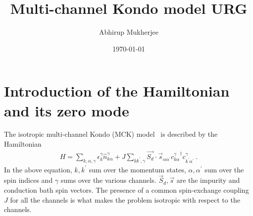 \documentclass[12pt]{revtex4-2}
\begin{document}
\title{Multi-channel Kondo model URG}
\author{Abhirup Mukherjee}
\date{\today}
\maketitle
\tableofcontents
\section{Introduction of the Hamiltonian and its zero mode}
The isotropic multi-channel Kondo (MCK) model~\cite{Noz_blandin_1980,Gan_Andrei_Coleman_1993,emery_kivelson,Gan_mchannel_1994,Tsvelick_Weigmann_mchannel_1984,Tsvelick_weigmann_mchannel_1985,parcollet_olivier_large_N,kimura_taro_Su_N_kondo,PhysRevB.73.224445,cox_jarrell_two_channel_rev,affleck_1991_overscreen,Coleman_tsvelik,affleck1993exact,coleman_pepin_2003,roch_nicolas_costi_2009,schiller_avraham_2008,Durganandini_2011} is described by the Hamiltonian
\begin{align}
	\label{mc_ham}
	H = \sum_{k,\alpha,\gamma}\epsilon_{k}^\gamma \hat n^\gamma_{k\alpha} + J\sum_{kk^\prime,\gamma} \vec{S_d}\cdot\vec{s}_{\alpha\alpha^\prime}{c^\gamma_{k\alpha}}^\dagger c^\gamma_{k^\prime\alpha^\prime}~.
\end{align}
In the above equation, \(k,k^\prime\) sum over the momentum states, \(\alpha,\alpha^\prime\) sum over the spin indices and \(\gamma\) sums over the various channels. \(\vec S_d, \vec s\) are the impurity and conduction bath spin vectors. The presence of a common spin-exchange coupling \(J\) for all the channels is what makes the problem isotropic with respect to the channels.
\end{document}
